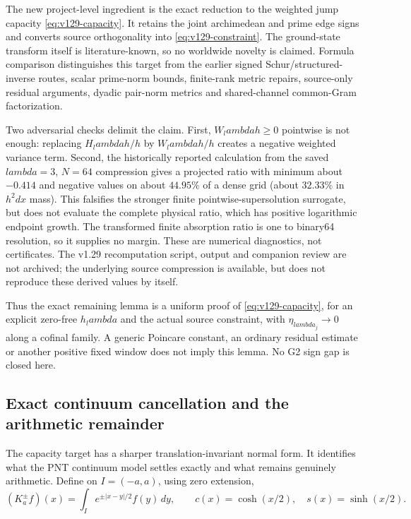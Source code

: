 \documentclass[11pt]{article}
\def\lambda{lambda}%
\theoremstyle{remark}
\begin{document}
The new project-level ingredient is the exact reduction to the
weighted jump capacity \eqref{eq:v129-capacity}. It retains the joint
archimedean and prime edge signs and converts source orthogonality into
\eqref{eq:v129-constraint}. The ground-state transform itself is
literature-known, so no worldwide novelty is claimed. Formula
comparison distinguishes this target from the earlier signed
Schur/structured-inverse routes, scalar prime-norm bounds, finite-rank
metric repairs, source-only residual arguments, dyadic pair-norm
metrics and shared-channel common-Gram factorization.

Two adversarial checks delimit the claim. First, $W_\lambda h\ge0$
pointwise is not enough: replacing $H_\lambda h/h$ by
$W_\lambda h/h$ creates a negative weighted variance term. Second,
the historically reported calculation from the saved $\lambda=3$, $N=64$
compression gives a projected ratio with
minimum about $-0.414$ and negative values on about $44.95\%$ of a
dense grid (about $32.33\%$ in $h^2dx$ mass). This falsifies the
stronger finite pointwise-supersolution surrogate, but does not
evaluate the complete physical ratio, which has positive logarithmic
endpoint growth. The transformed finite absorption ratio is one to
binary64 resolution, so it supplies no margin. These are numerical
diagnostics, not certificates. The v1.29 recomputation script, output
and companion review are not archived; the underlying source compression
is available, but does not reproduce these derived values by itself.

Thus the exact remaining lemma is a uniform proof of
\eqref{eq:v129-capacity}, for an explicit zero-free $h_\lambda$ and the
actual source constraint, with $\eta_{\lambda_j}\to0$ along a cofinal
family. A generic Poincare constant, an ordinary residual estimate or
another positive fixed window does not imply this lemma. No G2 sign
gap is closed here.

\subsection{Exact continuum cancellation and the arithmetic remainder}

The capacity target has a sharper translation-invariant normal form.
It identifies what the PNT continuum model settles exactly and what
remains genuinely arithmetic. Define on $I=(-a,a)$, using zero
extension,
\[
 (K_a^\pm f)(x)=\int_I e^{\pm|x-y|/2}f(y)\,dy,\qquad
 c(x)=\cosh(x/2),\quad s(x)=\sinh(x/2).
\]
\end{document}
